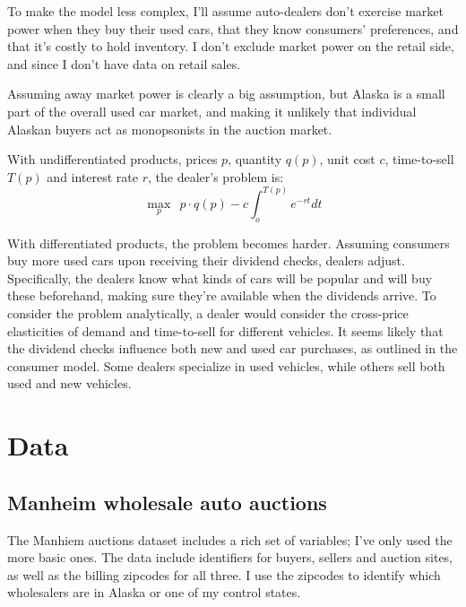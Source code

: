 \documentclass[11pt,letterpaper,oneside]{article}
\begin{document}
\begin{doublespacing}
To make the model less complex, I'll assume auto\hyp{}dealers don't exercise market power when they buy their used cars, that they know consumers' preferences, and that it's costly to hold inventory.
I don't exclude market power on the retail side, and since I don't have data on retail sales.

Assuming away market power is clearly a big assumption, but Alaska is a small part of the overall used car market, and making it unlikely that individual Alaskan buyers act as monopsonists in the auction market.

With undifferentiated products, prices $p$, quantity $q(p)$, unit cost $c$, time-to-sell $T(p)$ and interest rate $r$, the dealer's problem is:
\[
\max_p \ \ p \cdot q(p) - c \int_o^{T(p)} e^{-rt}dt
\]

With differentiated products, the problem becomes harder.
Assuming consumers buy more used cars upon receiving their dividend checks, dealers adjust.
Specifically, the dealers know what kinds of cars will be popular and will buy these beforehand, making sure they're available when the dividends arrive.
To consider the problem analytically, a dealer would consider the cross-price elasticities of demand and time-to-sell for different vehicles.
It seems likely that  the dividend checks influence both new and used car purchases, as outlined in the consumer model.
Some dealers specialize in used vehicles, while others sell both used and new vehicles.




\section{Data}
\label{sec:data}

\subsection{Manheim wholesale auto auctions}
\label{sec:manheim-data}



The Manhiem auctions dataset includes a rich set of variables; I've only used the more basic ones.
The data include identifiers for buyers, sellers and auction sites, as well as the billing zipcodes for all three.
I use the zipcodes to identify which wholesalers are in Alaska or one of my control states.


\end{doublespacing}
\end{document}
